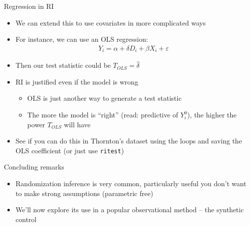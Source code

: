 \documentclass{beamer}
\begin{document}
\begin{frame}{Regression in RI}

\begin{itemize}
\item We can extend this to use covariates in more complicated ways
\item For instance, we can use an OLS regression:
\begin{eqnarray*}
Y_i = \alpha + \delta D_i + \beta X_i +  \varepsilon
\end{eqnarray*}
\item Then our test statistic could be $T_{OLS} = \widehat{\delta}$
\item RI is justified even if the model is wrong
	\begin{itemize}
	\item OLS is just another way to generate a test statistic
	\item The more the model is ``right'' (read: predictive of $Y_i^0$), the higher the power $T_{OLS}$ will have
	\end{itemize}
\item See if you can do this in Thornton's dataset using the loops and saving the OLS coefficient (or just use \texttt{ritest})
\end{itemize}

\end{frame}

\begin{frame}{Concluding remarks}

\begin{itemize}
\item Randomization inference is very common, particularly useful you don't want to make strong assumptions (parametric free)
\item We'll now explore its use in a popular observational method -- the synthetic control
\end{itemize}

\end{frame}
\end{document}
